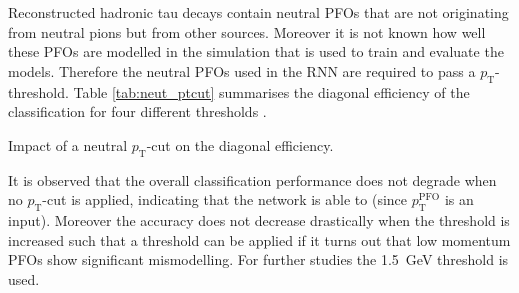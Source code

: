 Reconstructed hadronic tau decays contain neutral PFOs that are not originating
from neutral pions but from other sources. Moreover it is not known how well
these PFOs are modelled in the simulation that is used to train and evaluate the
models. Therefore the neutral PFOs used in the RNN are required to pass a
$p_\text{T}$-threshold. Table \ref{tab:neut_ptcut} summarises the diagonal
efficiency of the classification for four different thresholds .
\begin{table}[htb]
  \centering
  
  \caption{Impact of a neutral $p_\text{T}$-cut on the diagonal
    efficiency.}
  \label{tab:neut_ptcut}
\end{table}
It is observed that the overall classification performance does not degrade when
no $p_\text{T}$-cut is applied, indicating that the network is able to (since
$p_\text{T}^\text{PFO}$ is an input). Moreover the accuracy does not decrease
drastically  when the threshold is increased such that a
threshold can be applied if it turns out that low momentum PFOs show significant
mismodelling. For further studies the \SI{1.5}{\giga\electronvolt} threshold is
used.


